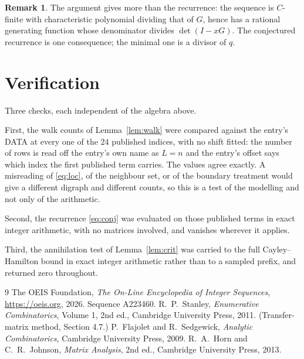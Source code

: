 \documentclass[11pt,a4paper]{article}
\theoremstyle{plain}
\theoremstyle{definition}
\newtheorem{remark}[theorem]{Remark}
\begin{document}
\begin{remark}
The argument gives more than the recurrence: the sequence is $C$-finite with characteristic
polynomial dividing that of $G$, hence has a rational generating function whose denominator
divides $\det(I-xG)$. The conjectured recurrence is one consequence; the minimal one is a
divisor of $q$.
\end{remark}

\section{Verification}

Three checks, each independent of the algebra above.

First, the walk counts of Lemma~\ref{lem:walk} were compared against the entry's DATA at
every one of the $24$ published indices, with no shift fitted: the number of rows is
read off the entry's own name as $L=n$ and the entry's offset says which index the first
published term carries. The values agree exactly. A misreading of \eqref{eq:loc}, of the
neighbour set, or of the boundary treatment would give a different digraph and different
counts, so this is a test of the modelling and not only of the arithmetic.

Second, the recurrence \eqref{eq:conj} was evaluated on those published terms in exact
integer arithmetic, with no matrices involved, and vanishes wherever it applies.

Third, the annihilation test of Lemma~\ref{lem:crit} was carried to the full
Cayley--Hamilton bound in exact integer arithmetic rather than to a sampled prefix, and
returned zero throughout.

\begin{thebibliography}{9}
 The OEIS Foundation, \emph{The On-Line Encyclopedia of Integer
Sequences}, \url{https://oeis.org}, 2026. Sequence A223460.
 R.~P.~Stanley, \emph{Enumerative Combinatorics}, Volume 1, 2nd ed.,
Cambridge University Press, 2011. (Transfer-matrix method, Section 4.7.)
 P.~Flajolet and R.~Sedgewick, \emph{Analytic Combinatorics}, Cambridge
University Press, 2009.
 R.~A.~Horn and C.~R.~Johnson, \emph{Matrix Analysis}, 2nd ed., Cambridge
University Press, 2013.
\end{thebibliography}
\end{document}
